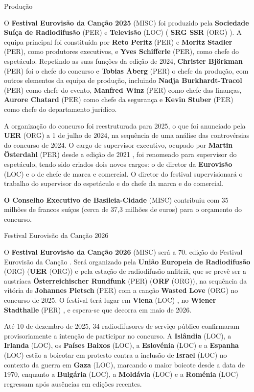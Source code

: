\documentclass[12pt,a4paper]{article}
\begin{document}
Produção

O \textbf{Festival Eurovisão da Canção 2025} (MISC) foi produzido pela \textbf{Sociedade Suíça de Radiodifusão} (PER) e \textbf{Televisão} (LOC) ( \textbf{SRG SSR} (ORG) ). A equipa principal foi constituída por \textbf{Reto Peritz} (PER) e \textbf{Moritz Stadler} (PER), como produtores executivos, e \textbf{Yves Schifferle} (PER), como chefe do espetáculo. Repetindo as suas funções da edição de 2024, \textbf{Christer Björkman} (PER) foi o chefe do concurso e \textbf{Tobias Åberg} (PER) o chefe da produção, com outros elementos da equipa de produção, incluindo \textbf{Nadja Burkhardt-Tracol} (PER) como chefe do evento, \textbf{Manfred Winz} (PER) como chefe das finanças, \textbf{Aurore Chatard} (PER) como chefe da segurança e \textbf{Kevin Stuber} (PER) como chefe do departamento jurídico.

A organização do concurso foi reestruturada para 2025, o que foi anunciado pela \textbf{UER} (ORG) a 1 de julho de 2024, na sequência de uma análise das controvérsias do concurso de 2024. O cargo de supervisor executivo, ocupado por \textbf{Martin Österdahl} (PER) desde a edição de 2021 , foi renomeado para supervisor do espetáculo, tendo sido criados dois novos cargos: o de diretor da \textbf{Eurovisão} (LOC) e o de chefe de marca e comercial. O diretor do festival supervisionará o trabalho do supervisor do espetáculo e do chefe da marca e do comercial.

\textbf{O Conselho Executivo de Basileia-Cidade} (MISC) contribuiu com 35 milhões de francos suíços (cerca de 37,3 milhões de euros) para o orçamento do concurso.



Festival Eurovisão da Canção 2026



O \textbf{Festival Eurovisão da Canção 2026} (MISC) será a 70. edição do Festival Eurovisão da Canção . Será organizado pela \textbf{União Europeia de Radiodifusão} (ORG) (\textbf{UER} (ORG)) e pela estação de radiodifusão anfitriã, que se prevê ser a austríaca \textbf{Österreichischer Rundfunk} (PER) (\textbf{ORF} (ORG)), na sequência da vitória de \textbf{Johannes Pietsch} (PER) com a canção  \textbf{Wasted Love} (ORG)  no concurso de 2025. O festival terá lugar em \textbf{Viena} (LOC) , no \textbf{Wiener Stadthalle} (PER) , e espera-se que decorra em maio de 2026.

Até 10 de dezembro de 2025, 34 radiodifusores de serviço público confirmaram provisoriamente a intenção de participar no concurso. A \textbf{Islândia} (LOC), a \textbf{Irlanda} (LOC), os \textbf{Países Baixos} (LOC), a \textbf{Eslovénia} (LOC) e a \textbf{Espanha} (LOC) estão a boicotar em protesto contra a inclusão de \textbf{Israel} (LOC) no contexto da guerra em \textbf{Gaza} (LOC), marcando o maior boicote desde a data de 1970, enquanto a \textbf{Bulgária} (LOC), a \textbf{Moldávia} (LOC) e a \textbf{Roménia} (LOC) regressam após ausências em edições recentes.
\end{document}
